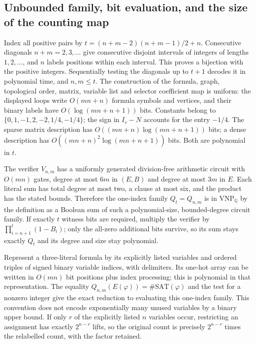 \subsection{Unbounded family, bit evaluation, and the size of the counting map}

Index all positive pairs by
$t=(n+m-2)(n+m-1)/2+n$. Consecutive diagonals $n+m=2,3,\ldots$
give consecutive disjoint intervals of integers of lengths
$1,2,\ldots$, and $n$ labels positions within each interval.
This proves a bijection with the positive integers. Sequentially
testing the diagonals up to $t+1$ decodes it in polynomial time,
and $n,m\le t$. The construction of the formula, graph, topological
order, matrix, variable list and selector coefficient map is uniform:
the displayed loops write $O(mn+n)$ formula symbols and vertices,
and their binary labels have $O(\log(mn+n+1))$ bits. Constants
belong to $\{0,1,-1,2,-2,1/4,-1/4\}$; the sign in $I_v-N$
accounts for the entry $-1/4$. The sparse matrix description
has $O((mn+n)\log(mn+n+1))$ bits; a dense description has
$O((mn+n)^2\log(mn+n+1))$ bits. Both are polynomial in $t$.

The verifier $V_{n,m}$ has a uniformly generated division-free
arithmetic circuit with $O(mn)$ gates, degree at most $6m$ in
$(E,B)$ and degree at most $3m$ in $E$. Each literal sum has total
degree at most two, a clause at most six, and the product has the
stated bounds. Therefore the one-index family $Q_t=Q_{n,m}$ is
in $\mathrm{VNP}_{\mathbb Q}$ by the definition as a Boolean sum
of such a polynomial-size, bounded-degree circuit family. If exactly
$t$ witness bits are required, multiply the verifier by
$\prod_{i=n+1}^t(1-B_i)$; only the all-zero additional bits survive,
so its sum stays exactly $Q_t$ and its degree and size stay polynomial.

Represent a three-literal formula by its explicitly listed variables
and ordered triples of signed binary variable indices, with delimiters.
Its one-hot array can be written in $O(mn)$ bit positions plus index
processing; this is polynomial in that representation. The equality
$Q_{n,m}(E(\varphi))=\#\mathrm{SAT}(\varphi)$ and the test for
a nonzero integer give the exact reduction to evaluating this
one-index family. This convention does not encode exponentially many
unused variables by a binary upper bound. If only $r$ of the explicitly
listed $n$ variables occur, restricting an assignment has exactly
$2^{n-r}$ lifts, so the original count is precisely $2^{n-r}$ times
the relabelled count, with the factor retained.

